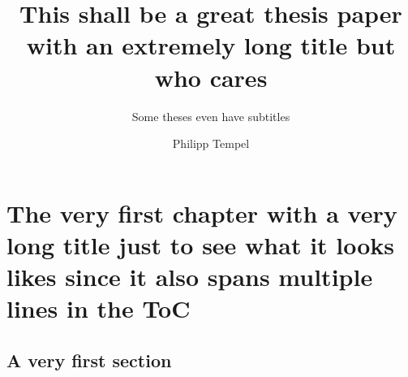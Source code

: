 \documentclass[%
    thesis=ma, %
    language=american, %
    paper=a4,%
]{isw}
\title{This shall be a great thesis paper with an extremely long title but who cares}
\subtitle{Some theses even have subtitles}
\author{Philipp Tempel}
\begin{document}
    \maketitle
    
    \begin{otherlanguage}{ngerman}\maketitle \end{otherlanguage}
    
    \tableofcontents
    
    \listoffigures
    
    \listoftables
    
    \chapter{The very first chapter with a very long title just to see what it looks likes since it also spans multiple lines in the ToC}
    
    \section{A very first section}
    
    \lipsum[1-60]
\end{document}
